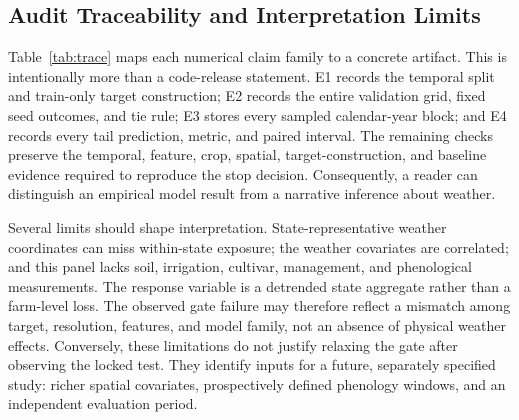\documentclass[conference]{IEEEtran}
\begin{document}
\begin{table}[t]
\centering
\caption{Exact temporal robustness and prefix learning-curve checks. Each entry
compares the locked weather-only configuration to zero residual with paired
calendar-year-block 95\% intervals.}
\label{tab:temporalcapacity}
\scriptsize
\resizebox{\textwidth}{!}{}
\end{table}

\subsection{Audit Traceability and Interpretation Limits}
Table~\ref{tab:trace} maps each numerical claim family to a concrete artifact.
This is intentionally more than a code-release statement. E1 records the temporal
split and train-only target construction; E2 records the entire validation grid,
fixed seed outcomes, and tie rule; E3 stores every sampled calendar-year block;
and E4 records every tail prediction, metric, and paired interval. The remaining
checks preserve the temporal, feature, crop, spatial, target-construction, and
baseline evidence required to reproduce the stop decision. Consequently, a reader
can distinguish an empirical model result from a narrative inference about weather.

\begin{table}[t]
\centering
\caption{E1--E10 numerical traceability. VERIFIED means the evidence artifact
was regenerated and checked; it does not mean a scientific gate passed.}
\label{tab:trace}
\scriptsize
\resizebox{\columnwidth}{!}{}
\end{table}

Several limits should shape interpretation. State-representative weather
coordinates can miss within-state exposure; the weather covariates are correlated;
and this panel lacks soil, irrigation, cultivar, management, and phenological
measurements. The response variable is a detrended state aggregate rather than a
farm-level loss. The observed gate failure may therefore reflect a mismatch among
target, resolution, features, and model family, not an absence of physical weather
effects. Conversely, these limitations do not justify relaxing the gate after
observing the locked test. They identify inputs for a future, separately specified
study: richer spatial covariates, prospectively defined phenology windows, and an
independent evaluation period.
\end{document}

